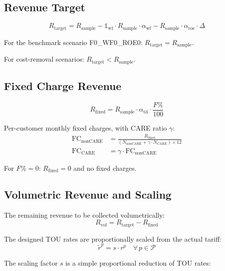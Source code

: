 \documentclass[11pt]{article}
\newcommand{\Rsample}{R_{\text{sample}}}
\newcommand{\Rtarget}{R_{\text{target}}}
\newcommand{\Rvol}{R_{\text{vol}}}
\newcommand{\Rfixed}{R_{\text{fixed}}}
\begin{document}
\subsection{Revenue Target}

\begin{equation}
\Rtarget = \Rsample - \mathbb{1}_{\text{wf}} \cdot \Rsample \cdot \alpha_{\text{wf}} - \Rsample \cdot \alpha_{\text{roe}} \cdot \Delta
\label{eq:r_target}
\end{equation}

For the benchmark scenario F0\_WF0\_ROE0: $\Rtarget = \Rsample$.

For cost-removal scenarios: $\Rtarget < \Rsample$.

\subsection{Fixed Charge Revenue}

\begin{equation}
\Rfixed = \Rsample \cdot \alpha_{\text{td}} \cdot \frac{F\%}{100}
\label{eq:r_fixed}
\end{equation}

Per-customer monthly fixed charges, with CARE ratio $\gamma$:
\begin{align}
\text{FC}_{\text{nonCARE}} &= \frac{\Rfixed}{(N_{\text{nonCARE}} + \gamma \cdot N_{\text{CARE}}) \times 12} \\
\text{FC}_{\text{CARE}} &= \gamma \cdot \text{FC}_{\text{nonCARE}}
\label{eq:fixed_charges}
\end{align}

For $F\% = 0$: $\Rfixed = 0$ and no fixed charges.

\subsection{Volumetric Revenue and Scaling}

The remaining revenue to be collected volumetrically:
\begin{equation}
\Rvol = \Rtarget - \Rfixed
\label{eq:r_vol}
\end{equation}

The designed TOU rates are proportionally scaled from the actual tariff:
\begin{equation}
\tilde{r}^p = s \cdot r^p \quad \forall \, p \in \mathcal{P}
\label{eq:designed_rates}
\end{equation}

The scaling factor $s$ is a simple proportional reduction of TOU rates:
\end{document}

